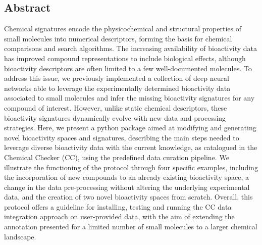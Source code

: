 \subsection{Abstract}

Chemical signatures encode the physicochemical and structural properties of small molecules into numerical descriptors, forming the basis for chemical comparisons and search algorithms. The increasing availability of bioactivity data has improved compound representations to include biological effects, although bioactivity descriptors are often limited to a few well-documented molecules. To address this issue, we previously implemented a collection of deep neural networks able to leverage the experimentally determined bioactivity data associated to small molecules and infer the missing bioactivity signatures for any compound of interest. However, unlike static chemical descriptors, these bioactivity signatures dynamically evolve with new data and processing strategies. Here, we present a python package aimed at modifying and generating novel bioactivity spaces and signatures, describing the main steps needed to leverage diverse bioactivity data with the current knowledge, as catalogued in the Chemical Checker (CC), using the predefined data curation pipeline. We illustrate the functioning of the protocol through four specific examples, including the incorporation of new compounds to an already existing bioactivity space, a change in the data pre-processing without altering the underlying experimental data, and the creation of two novel bioactivity spaces from scratch. Overall, this protocol offers a guideline for installing, testing and running the CC data integration approach on user-provided data, with the aim of extending the annotation presented for a limited number of small molecules to a larger chemical landscape.
